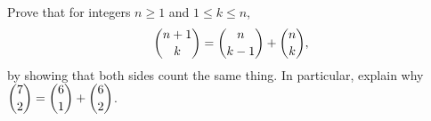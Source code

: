 Prove that for integers $n\ge1$ and $1\le k\le n$,
\[
\dbinom{n+1}{k}=\dbinom{n}{k-1}+\dbinom{n}{k},
\]
by showing that both sides count the same thing. In particular, explain why $\dbinom72=\dbinom61+\dbinom62$.
